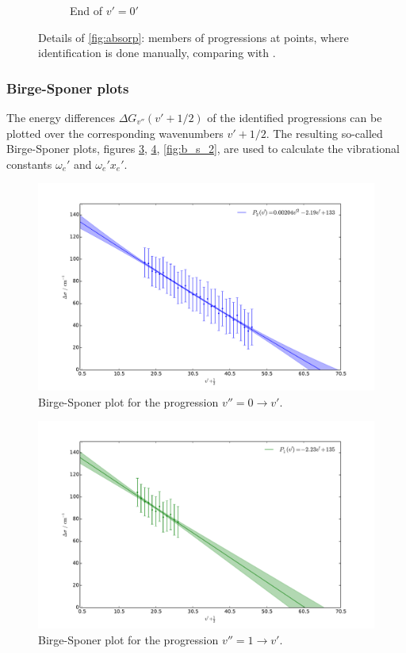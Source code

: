 \begin{figure}
\begin{subfigure}[b]{\mpltw}
        \caption{End of $v'=0'$}
        \label{fig:absorp_detail_03}
    \end{subfigure}
    \caption{Details of \ref{fig:absorp}: members of progressions at points, where 
    identification is done manually, comparing with \cite{staatsexamen}.
    }
    \label{fig:absorp_detail}
\end{figure}



\FloatBarrier

\subsubsection{Birge-Sponer plots}
The energy differences $\Delta G_{v''}(v' + 1/2)$ of the identified progressions can 
be plotted over the corresponding wavenumbers $v' + 1/2$. The resulting so-called 
Birge-Sponer plots, figures 
\ref{fig:b_s_0},  \ref{fig:b_s_1},  \ref{fig:b_s_2}, 
are used to calculate the vibrational constants $\omega_e'$ and $\omega_e' x_e'$. 

\begin{figure}
    \centering
    \includegraphics[width=\pltw]{analysis/figures/b_s_0.pdf}
    \caption{Birge-Sponer plot for the progression $v'' = 0 \rightarrow v'$.  
    }
    \label{fig:b_s_0}
\end{figure}

\begin{figure}
    \centering
    \includegraphics[width=\pltw]{analysis/figures/b_s_1.pdf}
    \caption{Birge-Sponer plot for the progression $v'' = 1 \rightarrow v'$.  
    }
    \label{fig:b_s_1}
\end{figure}

